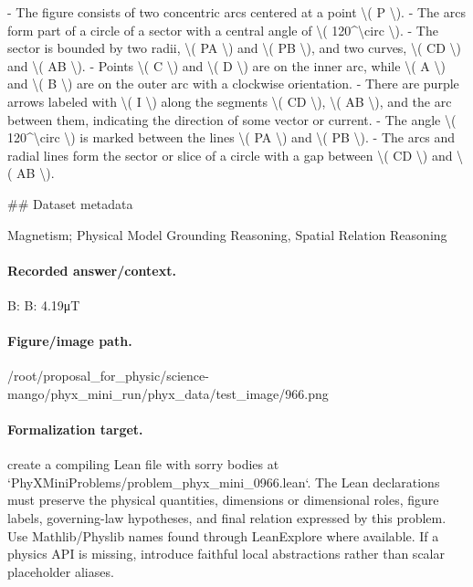 - The figure consists of two concentric arcs centered at a point \textbackslash{}( P \textbackslash{}).
- The arcs form part of a circle of a sector with a central angle of \textbackslash{}( 120\textasciicircum{}\textbackslash{}circ \textbackslash{}).
- The sector is bounded by two radii, \textbackslash{}( PA \textbackslash{}) and \textbackslash{}( PB \textbackslash{}), and two curves, \textbackslash{}( CD \textbackslash{}) and \textbackslash{}( AB \textbackslash{}).
- Points \textbackslash{}( C \textbackslash{}) and \textbackslash{}( D \textbackslash{}) are on the inner arc, while \textbackslash{}( A \textbackslash{}) and \textbackslash{}( B \textbackslash{}) are on the outer arc with a clockwise orientation.
- There are purple arrows labeled with \textbackslash{}( I \textbackslash{}) along the segments \textbackslash{}( CD \textbackslash{}), \textbackslash{}( AB \textbackslash{}), and the arc between them, indicating the direction of some vector or current.
- The angle \textbackslash{}( 120\textasciicircum{}\textbackslash{}circ \textbackslash{}) is marked between the lines \textbackslash{}( PA \textbackslash{}) and \textbackslash{}( PB \textbackslash{}).
- The arcs and radial lines form the sector or slice of a circle with a gap between \textbackslash{}( CD \textbackslash{}) and \textbackslash{}( AB \textbackslash{}).

\#\# Dataset metadata

Magnetism; Physical Model Grounding Reasoning, Spatial Relation Reasoning

\paragraph{Recorded answer/context.}
B: B: 4.19μT

\paragraph{Figure/image path.}
/root/proposal\_for\_physic/science-mango/phyx\_mini\_run/phyx\_data/test\_image/966.png

\paragraph{Formalization target.}
create a compiling Lean file with sorry bodies at `PhyXMiniProblems/problem\_phyx\_mini\_0966.lean`. The Lean declarations must preserve the physical quantities, dimensions or dimensional roles, figure labels, governing-law hypotheses, and final relation expressed by this problem.
Use Mathlib/Physlib names found through LeanExplore where available. If a physics API is missing, introduce faithful local abstractions rather than scalar placeholder aliases.


